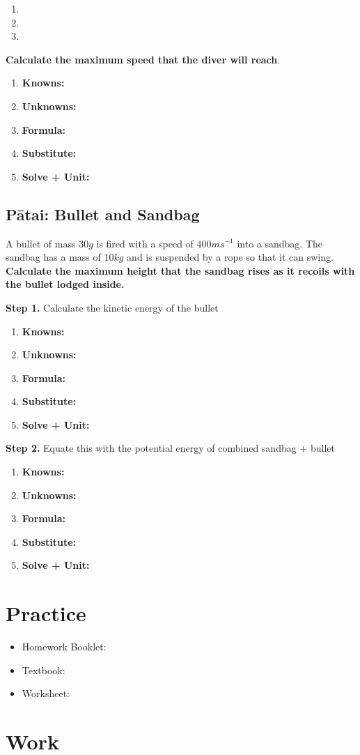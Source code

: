 \documentclass{report}
\newcommand\kufss{
	\begin{enumerate}[itemsep=15pt,label=,leftmargin=0.5cm]
		\item \textbf{Knowns:}
		\item \textbf{Unknowns:}
		\item \textbf{Formula:}
		\item \textbf{Substitute:}
		\item \textbf{Solve + Unit:}
	\end{enumerate}
}
\begin{document}
\begin{enumerate}[label=(\Alph*),itemsep=10pt]
	\item
	\item
	\item
\end{enumerate}

\textbf{Calculate the maximum speed that the diver will reach}.
\kufss

\subsection{Pātai: Bullet and Sandbag}
A bullet of mass $30g$ is fired with a speed of $400ms^{-1}$ into a sandbag. The sandbag has a mass of $10kg$ and is suspended by a rope so that it can swing. \textbf{Calculate the maximum height that the sandbag rises as it recoils with the bullet lodged inside.}

\textbf{Step 1.} Calculate the kinetic energy of the bullet

\kufss

\textbf{Step 2.} Equate this with the potential energy of combined sandbag + bullet

\kufss

\section{Practice}

\begin{itemize}
	\item Homework Booklet: 
	\item Textbook: 
	\item Worksheet: 
\end{itemize}

\section{Work}
\end{document}
